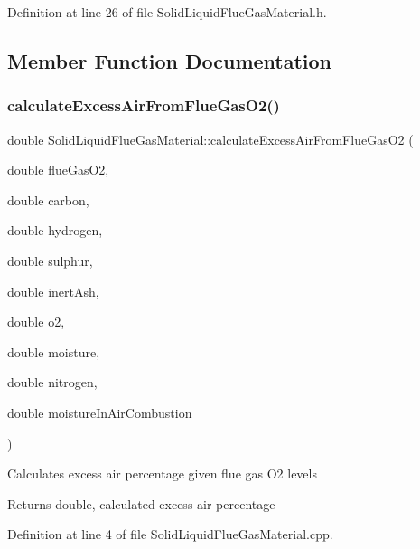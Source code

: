 Definition at line 26 of file Solid\+Liquid\+Flue\+Gas\+Material.\+h.



\subsection{Member Function Documentation}
\mbox{\label{class_solid_liquid_flue_gas_material_a57ddf04184687f8efe031986b591ad6b}} 
\subsubsection{\texorpdfstring{calculate\+Excess\+Air\+From\+Flue\+Gas\+O2()}{calculateExcessAirFromFlueGasO2()}\hspace{0.1cm}{\footnotesize\ttfamily [1/3]}}
{\footnotesize\ttfamily double Solid\+Liquid\+Flue\+Gas\+Material\+::calculate\+Excess\+Air\+From\+Flue\+Gas\+O2 (\begin{DoxyParamCaption}\item[{double}]{flue\+Gas\+O2,  }\item[{double}]{carbon,  }\item[{double}]{hydrogen,  }\item[{double}]{sulphur,  }\item[{double}]{inert\+Ash,  }\item[{double}]{o2,  }\item[{double}]{moisture,  }\item[{double}]{nitrogen,  }\item[{double}]{moisture\+In\+Air\+Combustion }\end{DoxyParamCaption})\hspace{0.3cm}{\ttfamily [static]}}

Calculates excess air percentage given flue gas O2 levels \begin{DoxyReturn}{Returns}
double, calculated excess air percentage 
\end{DoxyReturn}


Definition at line 4 of file Solid\+Liquid\+Flue\+Gas\+Material.\+cpp.

\mbox{\label{class_solid_liquid_flue_gas_material_abecacec1d6f108a8cdf002a9f67972c7}} 
